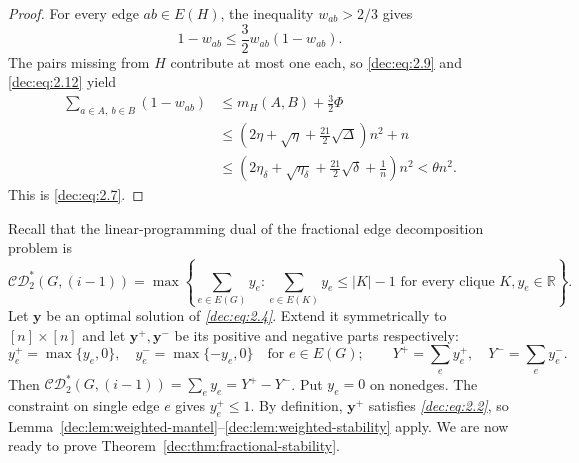 \documentclass[11pt]{article}
\numberwithin{equation}{section}
\theoremstyle{remark}
\newcommand{\R}{\mathbb R}
\newcommand{\CDstar}{\mathcal{CD}^{*}}
\begin{document}
\begin{proof}
For every edge \(ab\in E(H)\), the inequality \(w_{ab}>2/3\) gives
\begin{equation*}
 1-w_{ab}\le\frac32w_{ab}(1-w_{ab}).
\end{equation*}
The pairs missing from \(H\) contribute at most one each, so \eqref{dec:eq:2.9} and
\eqref{dec:eq:2.12} yield
\begin{equation*}
\begin{aligned}
 \sum_{a\in A,\ b\in B}(1-w_{ab})
 &\le m_H(A,B)+\frac32\Phi\\
 &\le
 \left(2\eta+\sqrt{\eta}
       +\frac{21}{2}\sqrt{\Delta}\right)n^2+n\\
 &\le
 \left(2\eta_\delta+\sqrt{\eta_\delta}
       +\frac{21}{2}\sqrt{\delta}+\frac1n\right)n^2
 <\theta n^2.
\end{aligned}
\end{equation*}
This is \eqref{dec:eq:2.7}.
\end{proof}

Recall that the linear-programming dual of the fractional edge decomposition problem is
\begin{equation}\label{dec:eq:2.4}
  \CDstar_2(G,(i-1))=\max\left\{\sum_{e\in E(G)}y_e:
  \sum_{e\in E(K)}y_e\le |K|-1\text{ for every clique }K, y_e\in \R\right\}.
\end{equation}
Let \(\mathbf{y}\) be an optimal solution of \emph{\eqref{dec:eq:2.4}}.
Extend it symmetrically to \([n]\times[n]\) and let \(\mathbf{y}^+,\mathbf{y}^-\) be
its positive and negative parts respectively:
\begin{equation*}
  y_e^+=\max\{y_e,0\},\quad y_e^-=\max\{-y_e,0\}\quad \text{for\ } e\in E(G);
  \qquad Y^+=\sum_e y_e^+,\quad Y^-=\sum_e y_e^-.
\end{equation*}
Then \(\CDstar_2(G,(i-1))=\sum_e y_e=Y^+-Y^-\). Put \(y_e=0\) on nonedges.
The constraint on single edge \(e\) gives \(y_e^+\le1\).
By definition, \(\mathbf{y}^+\) satisfies \emph{\eqref{dec:eq:2.2}},
so Lemma~\ref{dec:lem:weighted-mantel}--\ref{dec:lem:weighted-stability} apply.
We are now ready to prove Theorem~\ref{dec:thm:fractional-stability}.
\end{document}
